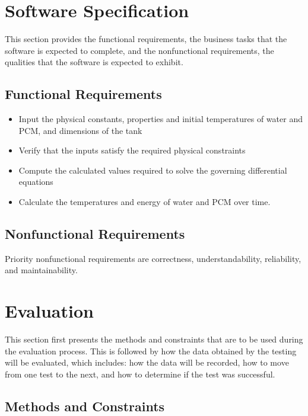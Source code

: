 \documentclass[12pt]{article}
\begin{document}
%
%

\section{ Software Specification}
This section provides the functional requirements, the business tasks that the
software is expected to complete, and the nonfunctional requirements, the
qualities that the software is expected to exhibit.

\subsection{Functional Requirements}

\noindent
\begin{itemize}
\item Input the physical constants, properties and initial temperatures of water
 and PCM, and dimensions of the tank  
\item Verify that the inputs satisfy the required physical constraints 
\item Compute the calculated values required to solve the governing differential equations
\item Calculate the temperatures and energy of water and PCM over time.
\end{itemize} 

\subsection{Nonfunctional Requirements}
Priority nonfunctional requirements are correctness, understandability,
reliability, and maintainability.


%
%

\section{Evaluation}
This section first presents the methods and constraints that are to be used
during the evaluation process. This is followed by how the data obtained by the
testing will be evaluated, which includes: how the data will be recorded, how to
move from one test to the next, and how to determine if the test was successful.

\subsection{ Methods and Constraints} 
\end{document}
